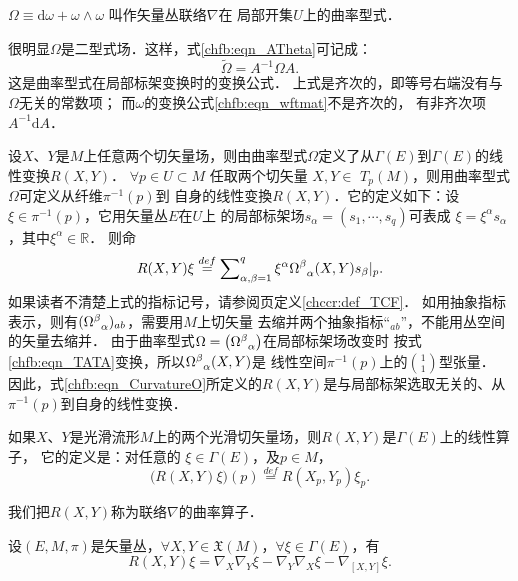\begin{definition}
    $\Omega \equiv \mathrm{d}\omega +  \omega\wedge\omega$ 叫作矢量丛联络$\nabla$在
    局部开集$U$上的{\heiti 曲率型式}．
\end{definition}

很明显$\Omega$是二型式场．这样，式\eqref{chfb:eqn_ATheta}可记成：
\begin{equation}\label{chfb:eqn_TATA}
    \widetilde{\Omega} =A^{-1} \Omega A .
\end{equation}
这是曲率型式在局部标架变换时的变换公式．
上式是齐次的，即等号右端没有与$\Omega$无关的常数项；
而$\omega$的变换公式\eqref{chfb:eqn_wftmat}不是齐次的，
有非齐次项$A^{-1} \mathrm{d}A$．


设$X$、$Y$是$M$上任意两个切矢量场，则由曲率型式$\Omega$定义了从$\Gamma(E)$到$\Gamma(E)$的线性变换$R(X, Y)$．
$\forall p \in U\subset M$ 任取两个切矢量 $X, Y \in$ $T_p(M)$，则用曲率型式$\Omega$可定义从纤维$\pi^{-1}(p)$到
自身的线性变換$R(X, Y)$．它的定义如下：设 $\xi \in \pi^{-1}(p)$，它用矢量丛$E$在$U$上
的局部标架场$s_\alpha=\left(s_1, \cdots, s_q\right)$可表成
$\xi = \xi^\alpha s_{\alpha}$，其中$\xi^\alpha \in \mathbb{R}$．
则命
\begin{equation}\label{chfb:eqn_CurvatureO}
    R(X, Y) \xi \overset{def}{=}\sum\nolimits_{\alpha, \beta=1}^q \xi^\alpha 
    \Omega_{\hphantom{\alpha}\alpha}^\beta(X, Y) s_{\beta}|_p .
\end{equation}
如果读者不清楚上式的指标记号，请参阅\pageref{chccr:def_TCF}页定义\ref{chccr:def_TCF}．
如用抽象指标表示，则有$(\Omega_{\hphantom{\alpha}\alpha}^\beta)_{ab}$，需要用$M$上切矢量
去缩并两个抽象指标“${}_{ab}$”，不能用丛空间的矢量去缩并．
由于曲率型式$\Omega=\left(\Omega_{\hphantom{\alpha}\alpha}^\beta\right)$在局部标架场改变时
按式\eqref{chfb:eqn_TATA}变换，所以$\Omega_{\hphantom{\alpha}\alpha}^\beta(X, Y)$是
线性空间$\pi^{-1}(p)$上的$\binom{1}{1}$型张量．
因此，式\eqref{chfb:eqn_CurvatureO}所定义的$R(X, Y)$是与局部标架选取无关的、从$\pi^{-1}(p)$到自身的线性变换．

如果$X$、$Y$是光滑流形$M$上的两个光滑切矢量场，则$R(X, Y)$是$\Gamma(E)$上的线性算子，
它的定义是：对任意的 $\xi \in \Gamma(E)$，及$p \in  M$，
\begin{equation}\label{chfb:eqn_RppR}
    \bigl(R(X, Y) \xi \bigr)(p)\overset{def}{=}R\left(X_p, Y_p\right) \xi_p .
\end{equation}

我们把$R(X, Y)$称为联络$\nabla$的{\heiti 曲率算子}．

\begin{theorem}\label{chfb:thm_Riemann-Curvature}
    设$(E,M,\pi)$是矢量丛，$\forall X, Y\in \mathfrak{X}(M)$，$\forall \xi \in \Gamma(E)$，有
    \begin{equation}\label{chfb:eqn_Riemann-Curvature}
       R(X, Y)\xi=\nabla_X \nabla_Y\xi- \nabla_Y \nabla_X\xi-\nabla_{[X, Y]}\xi .
    \end{equation}
\end{theorem}

